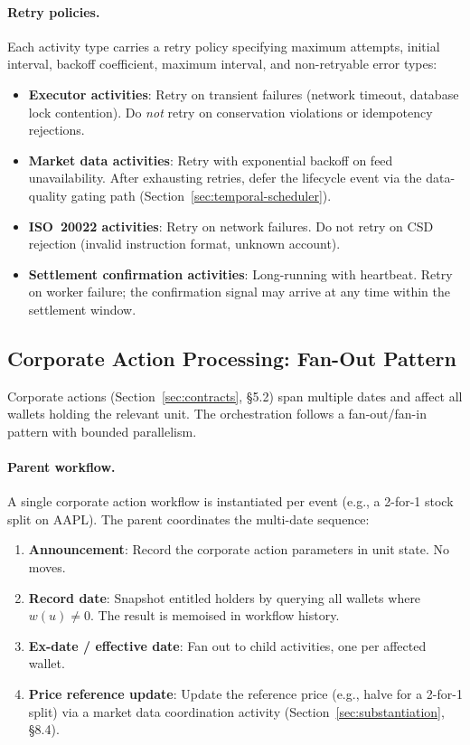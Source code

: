 \documentclass[11pt,a4paper]{article}
\begin{document}
\paragraph{Retry policies.}
Each activity type carries a retry policy specifying maximum attempts, initial interval, backoff coefficient, maximum interval, and non-retryable error types:

\begin{itemize}[nosep]
\item \textbf{Executor activities}: Retry on transient failures (network timeout, database lock contention). Do \emph{not} retry on conservation violations or idempotency rejections.
\item \textbf{Market data activities}: Retry with exponential backoff on feed unavailability. After exhausting retries, defer the lifecycle event via the data-quality gating path (Section~\ref{sec:temporal-scheduler}).
\item \textbf{ISO~20022 activities}: Retry on network failures. Do not retry on CSD rejection (invalid instruction format, unknown account).
\item \textbf{Settlement confirmation activities}: Long-running with heartbeat. Retry on worker failure; the confirmation signal may arrive at any time within the settlement window.
\end{itemize}

\subsection{Corporate Action Processing: Fan-Out Pattern}
\label{sec:temporal-corpaction}

Corporate actions (Section~\ref{sec:contracts}, \S5.2) span multiple dates and affect all wallets holding the relevant unit. The orchestration follows a fan-out/fan-in pattern with bounded parallelism.

\paragraph{Parent workflow.}
A single corporate action workflow is instantiated per event (e.g., a 2-for-1 stock split on AAPL). The parent coordinates the multi-date sequence:

\begin{enumerate}[nosep]
\item \textbf{Announcement}: Record the corporate action parameters in unit state. No moves.
\item \textbf{Record date}: Snapshot entitled holders by querying all wallets where $w(u) \neq 0$. The result is memoised in workflow history.
\item \textbf{Ex-date / effective date}: Fan out to child activities, one per affected wallet.
\item \textbf{Price reference update}: Update the reference price (e.g., halve for a 2-for-1 split) via a market data coordination activity (Section~\ref{sec:substantiation}, \S8.4).
\end{enumerate}
\end{document}
